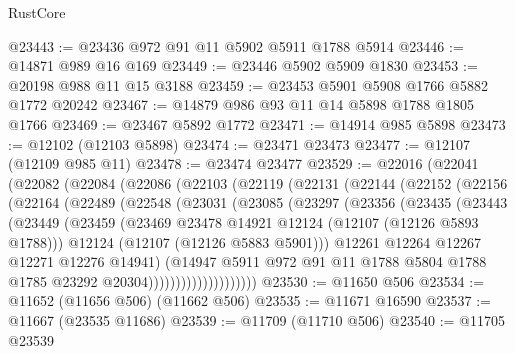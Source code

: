\begin{lexlean}{RustCore}
\begin{coremodule}
@23443 := @23436 @972 @91 @11 @5902 @5911 @1788 @5914
@23446 := @14871 @989 @16 @169
@23449 := @23446 @5902 @5909 @1830
@23453 := @20198 @988 @11 @15 @3188
@23459 := @23453 @5901 @5908 @1766 @5882 @1772 @20242
@23467 := @14879 @986 @93 @11 @14 @5898 @1788 @1805 @1766
@23469 := @23467 @5892 @1772
@23471 := @14914 @985 @5898
@23473 := @12102 (@12103 @5898)
@23474 := @23471 @23473
@23477 := @12107 (@12109 @985 @11)
@23478 := @23474 @23477
@23529 := @22016
    (@22041
      (@22082
        (@22084
          (@22086
            (@22103
              (@22119
                (@22131
                  (@22144
                    (@22152
                      (@22156
                        (@22164
                          (@22489
                            (@22548
                              (@23031
                                (@23085
                                  (@23297
                                    (@23356
                                      (@23435
                                        (@23443
                                          (@23449
                                            (@23459
                                              (@23469
                                                @23478
                                                @14921
                                                @12124
                                                (@12107 (@12126 @5893 @1788)))
                                              @12124
                                              (@12107 (@12126 @5883 @5901)))
                                            @12261
                                            @12264
                                            @12267
                                            @12271
                                            @12276
                                            @14941)
                                          (@14947
                                            @5911
                                            @972
                                            @91
                                            @11
                                            @1788
                                            @5804
                                            @1788
                                            @1785
                                            @23292
                                            @20304))))))))))))))))))))
@23530 := @11650 @506
@23534 := @11652 (@11656 @506) (@11662 @506)
@23535 := @11671 @16590
@23537 := @11667 (@23535 @11686)
@23539 := @11709 (@11710 @506)
@23540 := @11705 @23539

\end{coremodule}
\end{lexlean}
